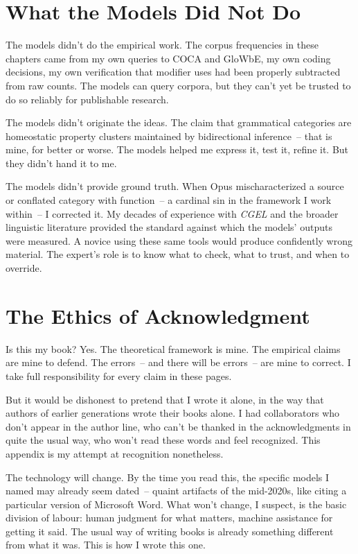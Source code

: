 \section*{What the Models Did Not Do}

The models didn't do the empirical work. The corpus frequencies in these chapters came from my own queries to COCA and GloWbE, my own coding decisions, my own verification that modifier uses had been properly subtracted from raw counts. The models can query corpora, but they can't yet be trusted to do so reliably for publishable research.

The models didn't originate the ideas. The claim that grammatical categories are homeostatic property clusters maintained by bidirectional inference~-- that is mine, for better or worse. The models helped me express it, test it, refine it. But they didn't hand it to me.

The models didn't provide ground truth. When Opus mischaracterized a source or conflated category with function~-- a cardinal sin in the framework I work within~-- I corrected it. My decades of experience with \textit{CGEL} and the broader linguistic literature provided the standard against which the models' outputs were measured. A novice using these same tools would produce confidently wrong material. The expert's role is to know what to check, what to trust, and when to override.

\section*{The Ethics of Acknowledgment}

Is this my book? Yes. The theoretical framework is mine. The empirical claims are mine to defend. The errors~-- and there will be errors~-- are mine to correct. I take full responsibility for every claim in these pages.

But it would be dishonest to pretend that I wrote it alone, in the way that authors of earlier generations wrote their books alone. I had collaborators who don't appear in the author line, who can't be thanked in the acknowledgments in quite the usual way, who won't read these words and feel recognized. This appendix is my attempt at recognition nonetheless.

The technology will change. By the time you read this, the specific models I named may already seem dated~-- quaint artifacts of the mid-2020s, like citing a particular version of Microsoft Word. What won't change, I suspect, is the basic division of labour: human judgment for what matters, machine assistance for getting it said. The usual way of writing books is already something different from what it was. This is how I wrote this one.
